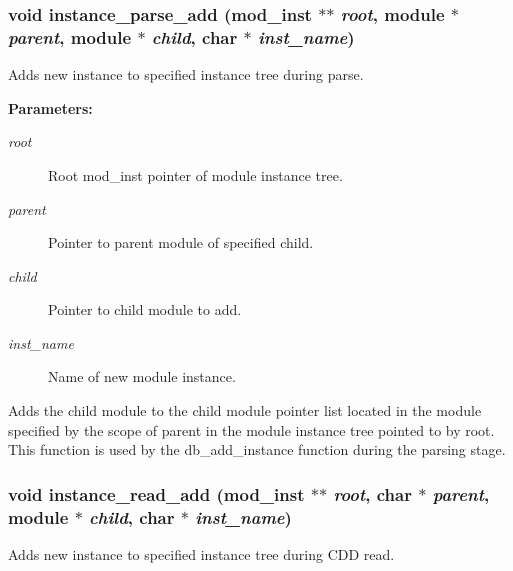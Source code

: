 \subsubsection{\setlength{\rightskip}{0pt plus 5cm}void instance\_\-parse\_\-add ({\bf mod\_\-inst} $\ast$$\ast$ {\em root}, {\bf module} $\ast$ {\em parent}, {\bf module} $\ast$ {\em child}, char $\ast$ {\em inst\_\-name})}\label{instance_8c_a8}


Adds new instance to specified instance tree during parse.

\begin{Desc}
\item[{\bf Parameters: }]\par
\begin{description}
\item[
{\em root}]Root mod\_\-inst pointer of module instance tree. \item[
{\em parent}]Pointer to parent module of specified child. \item[
{\em child}]Pointer to child module to add. \item[
{\em inst\_\-name}]Name of new module instance.

\end{description}
\end{Desc}
Adds the child module to the child module pointer list located in the module specified by the scope of parent in the module instance tree pointed to by root. This function is used by the db\_\-add\_\-instance function during the parsing stage. 
\subsubsection{\setlength{\rightskip}{0pt plus 5cm}void instance\_\-read\_\-add ({\bf mod\_\-inst} $\ast$$\ast$ {\em root}, char $\ast$ {\em parent}, {\bf module} $\ast$ {\em child}, char $\ast$ {\em inst\_\-name})}\label{instance_8c_a9}


Adds new instance to specified instance tree during CDD read.

